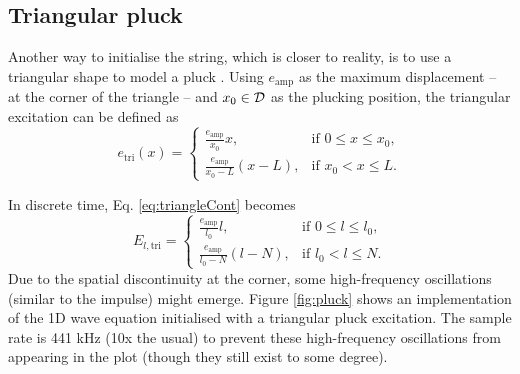 \subsection{Triangular pluck}\label{sec:pluck}
Another way to initialise the string, which is closer to reality, is to use a triangular shape to model a pluck \cite{Fletcher1998, theBible}.%
%
Using $e_\text{amp}$ as the maximum displacement -- at the corner of the triangle -- and $x_0\in \mathcal{D}$ as the plucking position, the triangular excitation can be defined as
\begin{equation}\label{eq:triangleCont}
    e_\text{tri}(x) = \begin{cases}
        \frac{e_\text{amp}}{x_0} x, & \text{if } 0\leq x \leq x_0,\\
        \frac{e_\text{amp}}{x_0 - L} (x - L), &\text{if } x_0 < x \leq L.
    \end{cases}
\end{equation}

In discrete time, Eq. \eqref{eq:triangleCont} becomes 
\begin{equation}
    E_{l, \text{tri}} = \begin{cases}
        \frac{e_\text{amp}}{l_0} l, & \text{if } 0\leq l \leq l_0,\\
        \frac{e_\text{amp}}{l_0 - N} (l - N), &\text{if } l_0 < l \leq N.
    \end{cases}
\end{equation}
Due to the spatial discontinuity at the corner, some high-frequency oscillations (similar to the impulse) might emerge. Figure \ref{fig:pluck} shows an implementation of the 1D wave equation initialised with a triangular pluck excitation. The sample rate is 441 kHz (10x the usual) to prevent these high-frequency oscillations from appearing in the plot (though they still exist to some degree). 

